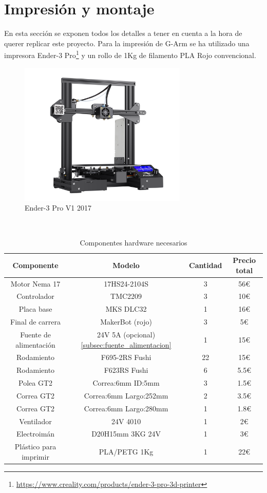 \section{Impresión y montaje}
En esta sección se exponen todos los detalles a tener en cuenta a la hora de querer replicar este proyecto. Para la impresión 
de G-Arm se ha utilizado una impresora Ender-3 Pro\footnote{\url{https://www.creality.com/products/ender-3-pro-3d-printer}} y un rollo 
de 1Kg de filamento PLA Rojo convencional.
\begin{figure} [h!]
\begin{center}
  \includegraphics[width=8cm]{figs/ender3.png}
\end{center}
\caption{Ender-3 Pro V1 2017}
\label{fig:ender3pro}
\end{figure}\   

\begin{table}[H]
\begin{center}
\begin{tabular}{|c|c|c|c|}
\hline
\textbf{Componente} & \textbf{Modelo} & \textbf{Cantidad} & \textbf{Precio total} \\
\hline
Motor Nema 17 & 17HS24-2104S & 3 & 56\euro \\
Controlador & TMC2209 & 3 & 10\euro \\
Placa base & MKS DLC32 & 1 & 16\euro \\
Final de carrera & MakerBot (rojo) & 3 & 5\euro \\
Fuente de alimentación & 24V 5A (opcional)\ref{subsec:fuente_alimentacion} & 1 & 15\euro \\
Rodamiento &  F695-2RS Fushi & 22 & 15\euro \\
Rodamiento & F623RS Fushi & 6 & 5.5\euro \\
Polea GT2 & Correa:6mm ID:5mm & 3 & 1.5\euro \\
Correa GT2 & Correa:6mm Largo:252mm & 2 & 3.5\euro \\ 
Correa GT2 &  Correa:6mm Largo:280mm & 1 & 1.8\euro \\ 
Ventilador & 24V 4010 & 1 & 2\euro \\
Electroimán & D20H15mm 3KG 24V & 1 & 3\euro \\
Plástico para imprimir & PLA/PETG 1Kg & 1 & 22\euro \\
\hline
\end{tabular}
\caption{Componentes hardware necesarios}
\label{cuadro:componentes}
\end{center}
\end{table}

